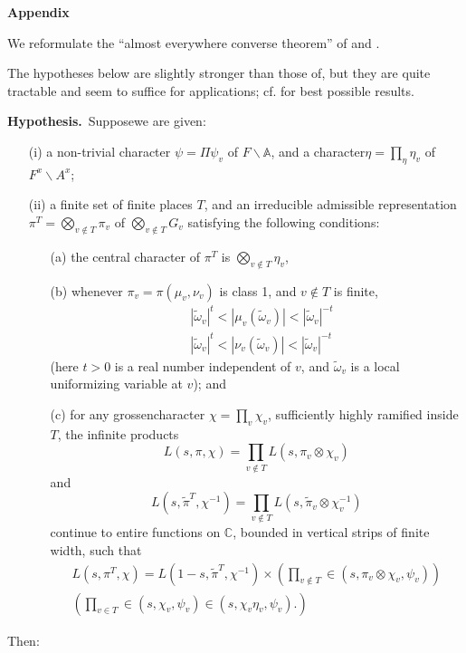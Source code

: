 \medskip
\noindent
{\bf Appendix}
\smallskip

We reformulate the ``almost everywhere converse theorem'' of\break \cite{Jacquet-Langlands} and \cite{Weil2}.

The hypotheses below are slightly stronger than those of\break \cite{Jacquet-Langlands}, but they are quite tractable and seem to suffice for applications; cf. \cite{PS2} for best possible results.

\medskip
\noindent
{\bf Hypothesis.}~Suppose\pageoriginale we are given:
\begin{itemize}
\item[(i)] a non-trivial character $\psi=\Pi\psi_{v}$ of $F\backslash \mathbb{A}$, and a character\break $\eta=\prod\limits_{\eta}\eta_{v}$ of $F^{x}\backslash A^{x}$;

\item[(ii)] a finite set of finite places $T$, and an irreducible admissible representation $\pi^{T}=\bigotimes\limits_{v\not\in T}\pi_{v}$ of $\bigotimes\limits_{v\not\in T}G_{v}$ satisfying the following conditions:
\begin{itemize}
\item[(a)] the central character of $\pi^{T}$ is $\bigotimes\limits_{v\not\in T}\eta_{v}$,

\item[(b)] whenever $\pi_{v}=\pi(\mu_{v},\nu_{v})$ is class 1, and $v\not\in T$ is finite,
\begin{align*}
& |\widetilde{\omega}_{v}|^{t}<|\mu_{v}(\widetilde{\omega}_{v})|<|\widetilde{\omega}_{v}|^{-t}\\[4pt]
& |\widetilde{\omega}_{v}|^{t}<|\nu_{v}(\widetilde{\omega}_{v})|<|\widetilde{\omega}_{v}|^{-t}
\end{align*}
(here $t>0$ is a real number independent of $v$, and $\widetilde{\omega}_{v}$ is a local uniformizing variable at $v$); and

\item[(c)] for any grossencharacter $\chi=\prod\limits_{v}\chi_{v}$, sufficiently highly ramified inside $T$, the infinite products
$$
L(s,\pi,\chi)=\prod\limits_{v\not\in T}L(s,\pi_{v}\otimes \chi_{v})
$$
and
$$
L(s,\widetilde{\pi}^{T},\chi^{-1})=\prod\limits_{v\not\in T}L(s,\widetilde{\pi}_{v}\otimes \chi^{-1}_{v})
$$
continue to entire functions on $\mathbb{C}$, bounded in vertical strips of finite width, such that
\begin{gather*}
L(s,\pi^{T},\chi)=L(1-s,\widetilde{\pi}^{T},\chi^{-1})\times\left(\prod\limits_{v\not\in T}\in (s,\pi_{v}\otimes \chi_{v},\psi_{v})\right)\\
\left(\prod\limits_{v\in T}\in (s,\chi_{v},\psi_{v})\in (s,\chi_{v}\eta_{v},\psi_{v}).\right)
\end{gather*}
\end{itemize}
\end{itemize}
Then:

